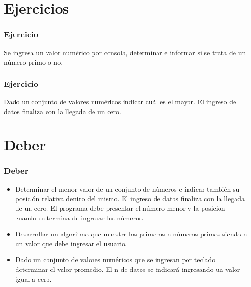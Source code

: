 \documentclass[handout]{beamer}
\begin{document}
\section{Ejercicios} %
\label{sec:ejercicios}

\begin{frame}[t]\frametitle{Ejercicio}
    
Se ingresa un valor numérico por consola, determinar e informar si se trata de un número primo o no.

\end{frame}

\begin{frame}[t]\frametitle{Ejercicio}
    
Dado un conjunto de valores numéricos indicar cuál es el mayor. El ingreso de datos  finaliza con la llegada de un cero.

\end{frame}

\section{Deber} %
\label{sec:deber}
\begin{frame}[t]\frametitle{Deber}
    
\begin{itemize}
    \item Determinar el menor valor de un conjunto de números e indicar también su posición relativa dentro del mismo. El ingreso de datos finaliza con la llegada de un cero. El programa debe presentar el número menor y la posición cuando se termina de ingresar los números.
    \item Desarrollar un algoritmo que muestre los primeros n números primos siendo n un valor que debe ingresar el usuario.
    \item Dado un conjunto de valores numéricos que se ingresan por teclado determinar el valor promedio. El  n de datos se indicará ingresando un valor igual a cero.
\end{itemize}


\end{frame}
\end{document}
